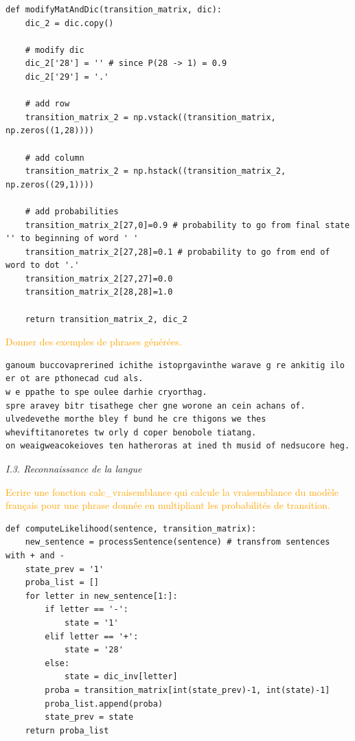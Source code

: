 \documentclass[11pt,a4paper,fleqn]{article}
\begin{document}
\lstset{language=Python}
\lstset{frame=lines}
\lstset{basicstyle=\footnotesize}
\begin{lstlisting}
def modifyMatAndDic(transition_matrix, dic):
    dic_2 = dic.copy()

    # modify dic
    dic_2['28'] = '' # since P(28 -> 1) = 0.9
    dic_2['29'] = '.'

    # add row
    transition_matrix_2 = np.vstack((transition_matrix, np.zeros((1,28))))

    # add column
    transition_matrix_2 = np.hstack((transition_matrix_2, np.zeros((29,1))))

    # add probabilities
    transition_matrix_2[27,0]=0.9 # probability to go from final state '' to beginning of word ' '
    transition_matrix_2[27,28]=0.1 # probability to go from end of word to dot '.'
    transition_matrix_2[27,27]=0.0
    transition_matrix_2[28,28]=1.0

    return transition_matrix_2, dic_2
\end{lstlisting}

\vspace{5mm}
\textcolor{orange}{Donner des exemples de phrases générées.}

\lstset{language=Python}
\lstset{frame=lines}
\lstset{basicstyle=\footnotesize}
\begin{lstlisting}
ganoum buccovaprerined ichithe istoprgavinthe warave g re ankitig ilo er ot are pthonecad cud als.
w e ppathe to spe oulee darhie cryorthag.
spre aravey bitr tisathege cher gne worone an cein achans of.
ulvedevethe morthe bley f bund he cre thigons we thes wheviftitanoretes tw orly d coper benobole tiatang.
on weaigweacokeioves ten hatheroras at ined th musid of nedsucore heg.
\end{lstlisting}

\vspace{5mm}
\textit{I.3. Reconnaissance de la langue}

\vspace{5mm}
\textcolor{orange}{Ecrire une fonction calc\_vraisemblance qui calcule la vraisemblance du modèle français pour une phrase donnée en multipliant les probabilités de transition.}

\lstset{language=Python}
\lstset{frame=lines}
\lstset{basicstyle=\footnotesize}
\begin{lstlisting}
def computeLikelihood(sentence, transition_matrix):
    new_sentence = processSentence(sentence) # transfrom sentences with + and -
    state_prev = '1'
    proba_list = []
    for letter in new_sentence[1:]:
        if letter == '-':
            state = '1'
        elif letter == '+':
            state = '28'
        else:
            state = dic_inv[letter]
        proba = transition_matrix[int(state_prev)-1, int(state)-1]
        proba_list.append(proba)
        state_prev = state
    return proba_list
\end{lstlisting}
\end{document}
